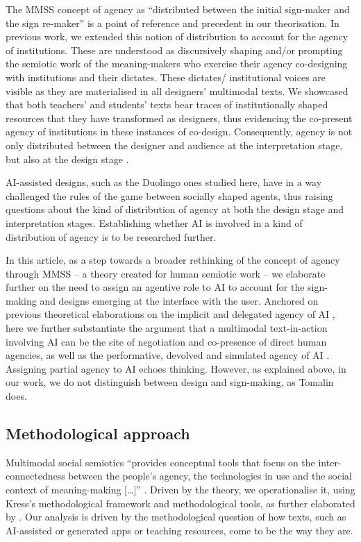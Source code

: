 \documentclass[english]{textolivre}
\begin{document}
The MMSS concept of agency as “distributed between the initial sign-maker and the sign re-maker” \cite[p. 25]{bezemer2016multimodality} is a point of reference and precedent in our theorisation. In previous work, we extended this notion of distribution to account for the agency of institutions. These are understood as discursively shaping and/or prompting the semiotic work of the meaning-makers who exercise their agency co-designing with institutions and their dictates. These dictates/ institutional voices are visible as they are materialised in all designers’ multimodal texts. We showcased that both teachers’ and students’ texts bear traces of institutionally shaped resources that they have transformed as designers, thus evidencing the co-present agency of institutions in these instances of co-design. Consequently, agency is not only distributed between the designer and audience at the interpretation stage, but also at the design stage \cite{diamantopoulou2024design}.

AI-assisted designs, such as the Duolingo ones studied here, have in a way challenged the rules of the game between socially shaped agents, thus raising questions about the kind of distribution of agency at both the design stage and interpretation stages. Establishing whether AI is involved in a kind of distribution of agency is to be researched further.

In this article, as a step towards a broader rethinking of the concept of agency through MMSS – a theory created for human semiotic work – we elaborate further on the need to assign an agentive role to AI to account for the sign-making and designs emerging at the interface with the user. Anchored on previous theoretical elaborations on the implicit and delegated agency of AI \cite{diamantopoulou2024design}, here we further substantiate the argument that a multimodal text-in-action involving AI can be the site of negotiation and co-presence of direct human agencies, as well as the performative, devolved and simulated agency of AI \cite{vondavier2025designing}. Assigning partial agency to AI echoes  thinking. However, as explained above, in our work, we do not distinguish between design and sign-making, as Tomalin does.

\subsection{Methodological approach}\label{sec-fmt-manuscrito}
Multimodal social semiotics “provides conceptual tools that focus on the inter-connectedness between the people’s agency, the technologies in use and the social context of meaning-making […]” \cite[p. 161]{jewitt2016social}. Driven by the theory, we operationalise it, using Kress’s methodological framework and methodological tools, as further elaborated by \textcite{jewitt2016social,diamantopoulou2026social}. Our analysis is driven by the methodological question of how texts, such as AI-assisted or generated apps or teaching resources, come to be the way they are.
\end{document}
